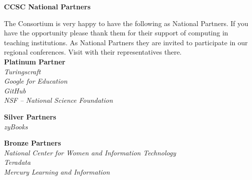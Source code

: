 \documentclass{article}
\begin{document}
\begingroup
  \centering
  \textbf{\LARGE CCSC National Partners}\\
\endgroup

\vspace{10pt}

The Consortium is very happy to have the following as National Partners. If you
have the opportunity please thank them for their support of computing in
teaching institutions. As National Partners they are invited to participate in
our regional conferences. Visit with their representatives there.\\

\begingroup
  \centering
  \textbf{\large Platinum Partner}\\
  \textsl{\large Turingscraft}\\
  \textsl{\large Google for Education}\\
  \textsl{\large GitHub}\\
  \textsl{\large NSF -- National Science Foundation}\\
\endgroup

\vspace{10pt}

\begingroup
  \centering
  \textbf{\large Silver Partners}\\
  \textsl{\large zyBooks}\\
\endgroup

\vspace{10pt}

\begingroup
  \centering
  \textbf{Bronze Partners}\\
  \textsl{National Center for Women and Information Technology}\\
  \textsl{Teradata}\\
  \textsl{Mercury Learning and Information}\\
\endgroup
\end{document}
